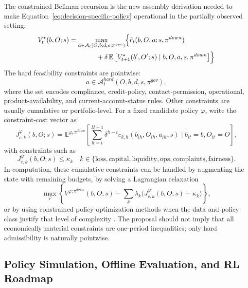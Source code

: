 \documentclass[11pt]{article}
\newcommand{\E}{\mathbb{E}}
\newcommand{\1}{\mathbf{1}}
\begin{document}
The constrained Bellman recursion is the new assembly derivation needed to make
Equation~\eqref{eq:decision-specific-policy} operational in the partially
observed setting:
\begin{align}
  V_t^{\star}(b,O;s)
  &=
  \max_{a\in\mathcal{A}_{t}(O,b;d,s,\pi^{gov})}
  \Bigl\{
    \bar r_t(b,O,a;s,\pi^{down})
    \nonumber\\
    &\qquad\qquad
    + \delta\,\E\left[V_{t+1}^{\star}(b',O';s)\mid b,O,a,s,\pi^{down}\right]
  \Bigr\}
  \label{eq:ss-bellman}
\end{align}
The hard feasibility constraints are pointwise:
\begin{equation}
  a\in \mathcal{A}^{hard}_{t}(O,b,d,s,\pi^{gov}),
  \label{eq:ss-hard-feasible}
\end{equation}
where the set encodes compliance, credit-policy, contact-permission, operational,
product-availability, and current-account-status rules. Other constraints are
usually cumulative or portfolio-level. For a fixed candidate policy $\varphi$,
write the constraint-cost vector as
\begin{equation}
  J^{\varphi}_{c,k}(b,O;s)
  =
  \E^{\varphi,\pi^{down}}\!\left[
    \sum_{h=t}^{H-1}\delta^{h-t}
    c_{k,h}(b_{ih},O_{ih},a_{ih};s)
    \mid b_{it}=b,O_{it}=O
  \right],
  \label{eq:ss-cumulative-constraint}
\end{equation}
with constraints such as
\begin{equation}
  J^{\varphi}_{c,k}(b,O;s)\le \kappa_k
  \quad
  k\in\{\mathrm{loss},\mathrm{capital},\mathrm{liquidity},
  \mathrm{ops},\mathrm{complaints},\mathrm{fairness}\}.
  \label{eq:ss-cmdp-constraints}
\end{equation}
In computation, these cumulative constraints can be handled by augmenting the
state with remaining budgets, by solving a Lagrangian relaxation
\begin{equation}
  \max_{\varphi}
  \left\{
    V^{\varphi;\pi^{down}}(b,O;s)
    -
    \sum_k \lambda_k\bigl(J^{\varphi}_{c,k}(b,O;s)-\kappa_k\bigr)
  \right\},
  \label{eq:ss-lagrangian-cmdp}
\end{equation}
or by using constrained policy-optimization methods when the data and policy
class justify that level of complexity \citep{achiam2017cpo}. The proposal should
not imply that all economically material constraints are one-period inequalities;
only hard admissibility is naturally pointwise.

\subsection{Policy Simulation, Offline Evaluation, and RL Roadmap}
\end{document}
